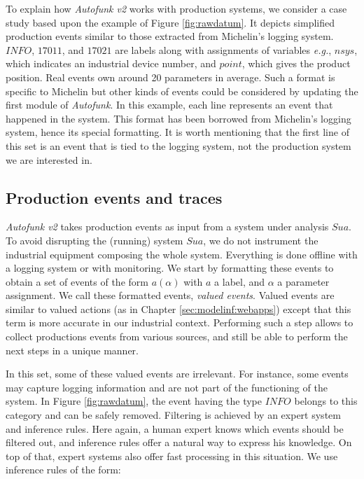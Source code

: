 \begin{example}
To explain how \textit{Autofunk v2} works with production
systems, we consider a case study based upon the example of
Figure \ref{fig:rawdatum}. It depicts simplified production
events similar to those extracted from Michelin's logging system.
$INFO$, $17011$, and $17021$ are labels along with assignments of
variables \emph{e.g.}, $nsys$, which indicates an industrial
device number, and $point$, which gives the product position.
Real events own around 20 parameters in average. Such a format is
specific to Michelin but other kinds of events could be
considered by updating the first module of \textit{Autofunk}.  In
this example, each line represents an event that happened in the
system. This format has been borrowed from Michelin's logging
system, hence its special formatting. It is worth mentioning that
the first line of this set is an event that is tied to the
logging system, not the production system we are interested in.
\end{example}

\subsection{Production events and traces}
\label{part3:collecting}

\textit{Autofunk v2} takes production events as input from a system
under analysis $\mathit{Sua}$. To avoid disrupting the (running)
system $\mathit{Sua}$, we do not instrument the industrial
equipment composing the whole system. Everything is done offline
with a logging system or with monitoring. We start by formatting
these events to obtain a set of events of the form $a(\alpha)$
with $a$ a label, and $\alpha$ a parameter assignment. We call
these formatted events, \textit{valued events}. Valued events are
similar to valued actions (as in Chapter
\ref{sec:modelinf:webapps}) except that this term is more
accurate in our industrial context.  Performing such a step
allows to collect productions events from various sources, and
still be able to perform the next steps in a unique manner.

In this set, some of these valued events are irrelevant.  For
instance, some events may capture logging information and are not
part of the functioning of the system. In Figure
\ref{fig:rawdatum}, the event having the type $INFO$ belongs to
this category and can be safely removed. Filtering is achieved by
an expert system and inference rules. Here again, a human expert
knows which events should be filtered out, and inference rules
offer a natural way to express his knowledge. On top of that,
expert systems also offer fast processing in this situation. We
use inference rules of the form:

